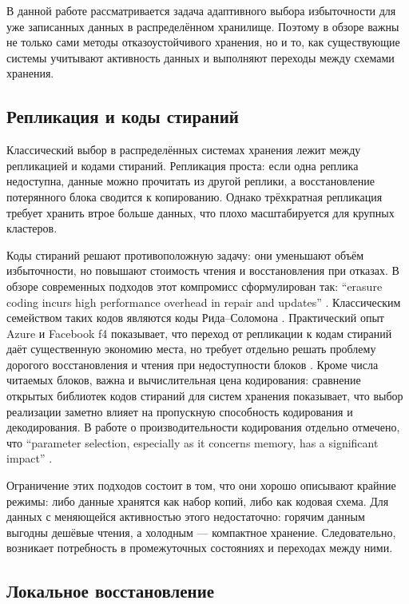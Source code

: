 
В данной работе рассматривается задача адаптивного выбора избыточности для уже
записанных данных в распределённом хранилище. Поэтому в обзоре важны не только
сами методы отказоустойчивого хранения, но и то, как существующие системы
учитывают активность данных и выполняют переходы между схемами хранения.

\subsection*{Репликация и коды стираний}

Классический выбор в распределённых системах хранения лежит между репликацией
и кодами стираний. Репликация проста: если одна реплика недоступна, данные можно
прочитать из другой реплики, а восстановление потерянного блока сводится к
копированию. Однако трёхкратная репликация требует хранить втрое больше данных,
что плохо масштабируется для крупных кластеров.

Коды стираний решают противоположную задачу: они уменьшают объём избыточности,
но повышают стоимость чтения и восстановления при отказах. В обзоре современных
подходов этот компромисс сформулирован так:
\enquote{erasure coding incurs high performance overhead in repair and updates}
\cite{shen2024erasurecoding}. Классическим семейством таких кодов являются коды
Рида--Соломона \cite{reed1960polynomial}. Практический опыт Azure и Facebook f4
показывает, что переход от репликации к кодам стираний даёт существенную
экономию места, но требует отдельно решать проблему дорогого восстановления и
чтения при недоступности блоков \cite{huang2012azure,muralidhar2014f4}.
Кроме числа читаемых блоков, важна и вычислительная цена кодирования:
сравнение открытых библиотек кодов стираний для систем хранения показывает, что
выбор реализации заметно влияет на пропускную способность кодирования и
декодирования. В работе о производительности кодирования отдельно отмечено,
что \enquote{parameter selection, especially as it concerns memory, has a
significant impact} \cite{plank2009performance}.

Ограничение этих подходов состоит в том, что они хорошо описывают крайние
режимы: либо данные хранятся как набор копий, либо как кодовая схема. Для
данных с меняющейся активностью этого недостаточно: горячим данным выгодны
дешёвые чтения, а холодным --- компактное хранение. Следовательно, возникает
потребность в промежуточных состояниях и переходах между ними.

\subsection*{Локальное восстановление}


